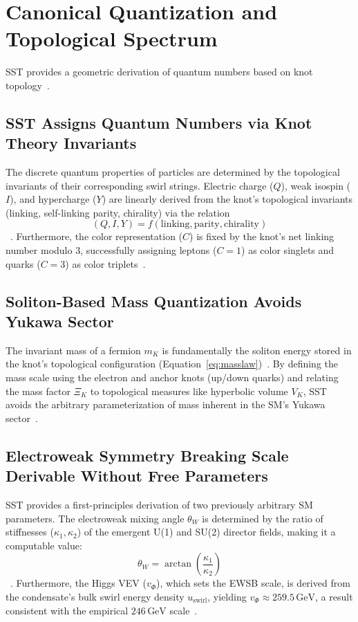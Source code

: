 \documentclass[10pt,reprint,aps,onecolumn,nofootinbib]{revtex4-2}
\begin{document}
\section{Canonical Quantization and Topological Spectrum}
\label{sec:quantization}

SST provides a geometric derivation of quantum numbers based on knot topology~\cite{1, 4}.

\subsection*{SST Assigns Quantum Numbers via Knot Theory Invariants}

The discrete quantum properties of particles are determined by the topological invariants of their corresponding swirl strings. Electric charge ($Q$), weak isospin ($I$), and hypercharge ($Y$) are linearly derived from the knot's topological invariants (linking, self-linking parity, chirality) via the relation
\[
(Q, I, Y) = f(\text{linking}, \text{parity}, \text{chirality})
\]
~\cite{4, 1}. Furthermore, the color representation ($C$) is fixed by the knot's net linking number modulo 3, successfully assigning leptons ($C=1$) as color singlets and quarks ($C=3$) as color triplets~\cite{4}.

\subsection*{Soliton-Based Mass Quantization Avoids Yukawa Sector}

The invariant mass of a fermion $m_K$ is fundamentally the soliton energy stored in the knot's topological configuration (Equation~\ref{eq:masslaw})~\cite{4}. By defining the mass scale using the electron and anchor knots (up/down quarks) and relating the mass factor $\Xi_K$ to topological measures like hyperbolic volume $V_K$, SST avoids the arbitrary parameterization of mass inherent in the SM's Yukawa sector~\cite{4}.

\subsection*{Electroweak Symmetry Breaking Scale Derivable Without Free Parameters}

SST provides a first-principles derivation of two previously arbitrary SM parameters. The electroweak mixing angle $\theta_W$ is determined by the ratio of stiffnesses ($\kappa_1, \kappa_2$) of the emergent U(1) and SU(2) director fields, making it a computable value:
\[
\theta_W = \arctan\left(\frac{\kappa_1}{\kappa_2}\right)
\]
~\cite{1}. Furthermore, the Higgs VEV ($v_\Phi$), which sets the EWSB scale, is derived from the condensate's bulk swirl energy density $u_{\text{swirl}}$, yielding $v_\Phi \approx 259.5\,\text{GeV}$, a result consistent with the empirical $246\,\text{GeV}$ scale~\cite{1}.
\end{document}
